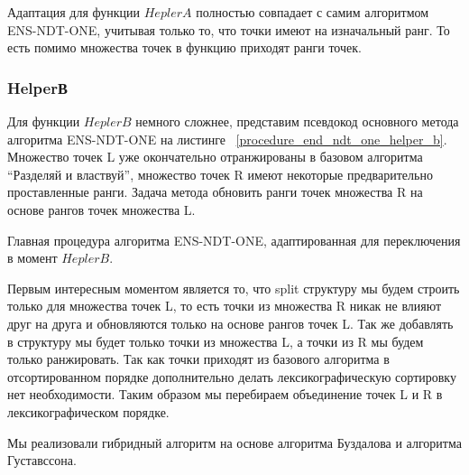 Адаптация для функции $HeplerA$ полностью совпадает с самим алгоритмом ENS-NDT-ONE, учитывая только то, что точки имеют на изначальный ранг. То есть помимо множества точек в функцию приходят ранги точек. 

\subsubsection{HelperВ}

Для функции $HeplerB$ немного сложнее, представим псевдокод основного метода алгоритма ENS-NDT-ONE на листинге ~\ref{procedure_end_ndt_one_helper_b}. Множество точек L уже окончательно отранжированы в базовом алгоритма ``Разделяй и властвуй'', множество точек R имеют некоторые предварительно проставленные ранги. Задача метода обновить ранги точек множества R на основе рангов точек множества L. 

\begin{algorithm}
\begin{algorithmic}[1]
        \EndIf
        \EndIf
    \EndFor
\EndProcedure
\end{algorithmic}
\caption{Главная процедура алгоритма ENS-NDT-ONE, адаптированная для переключения в момент $HeplerB$.}
\label{procedure_end_ndt_one_helper_b}
\end{algorithm}

Первым интересным моментом является то, что split структуру мы будем строить только для множества точек L, то есть точки из множества R никак не влияют друг на друга и обновляются только на основе рангов точек L. Так же добавлять в структуру мы будет только точки из множества L, а точки из R мы будем только ранжировать. Так как точки приходят из базового алгоритма в отсортированном порядке дополнительно делать лексикографическую сортировку нет необходимости. Таким образом мы перебираем объединение точек L и R в лексикографическом порядке. 

Мы реализовали гибридный алгоритм на основе алгоритма Буздалова и алгоритма Густавссона. 

